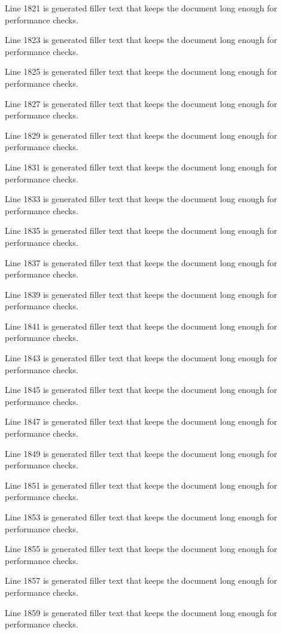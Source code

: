 Line 1821 is generated filler text that keeps the document long enough for performance checks.

Line 1823 is generated filler text that keeps the document long enough for performance checks.

Line 1825 is generated filler text that keeps the document long enough for performance checks.

Line 1827 is generated filler text that keeps the document long enough for performance checks.

Line 1829 is generated filler text that keeps the document long enough for performance checks.

Line 1831 is generated filler text that keeps the document long enough for performance checks.

Line 1833 is generated filler text that keeps the document long enough for performance checks.

Line 1835 is generated filler text that keeps the document long enough for performance checks.

Line 1837 is generated filler text that keeps the document long enough for performance checks.

Line 1839 is generated filler text that keeps the document long enough for performance checks.

Line 1841 is generated filler text that keeps the document long enough for performance checks.

Line 1843 is generated filler text that keeps the document long enough for performance checks.

Line 1845 is generated filler text that keeps the document long enough for performance checks.

Line 1847 is generated filler text that keeps the document long enough for performance checks.

Line 1849 is generated filler text that keeps the document long enough for performance checks.

Line 1851 is generated filler text that keeps the document long enough for performance checks.

Line 1853 is generated filler text that keeps the document long enough for performance checks.

Line 1855 is generated filler text that keeps the document long enough for performance checks.

Line 1857 is generated filler text that keeps the document long enough for performance checks.

Line 1859 is generated filler text that keeps the document long enough for performance checks.

